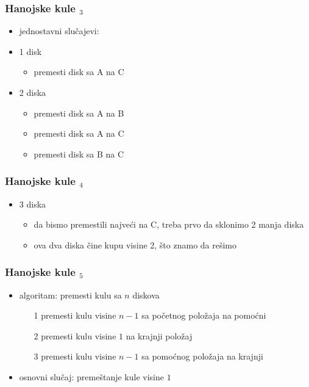 \documentclass[utf8,compress]{beamer}
\begin{document}
\begin{frame}[fragile]
  \frametitle{Hanojske kule $_3$}
  \begin{itemize}
    \item jednostavni slučajevi:
    \item 1 disk
  \begin{itemize}
    \item premesti disk sa A na C
  \end{itemize}
    \item 2 diska
  \begin{itemize}
    \item premesti disk sa A na B
    \item premesti disk sa A na C
    \item premesti disk sa B na C
  \end{itemize}
  \end{itemize}
\end{frame}

\begin{frame}[fragile]
  \frametitle{Hanojske kule $_4$}
  \begin{itemize}
    \item 3 diska
  \begin{itemize}
    \item da bismo premestili najveći na C, treba prvo da sklonimo 2 manja diska
    \item ova dva diska čine kupu visine 2, što znamo da rešimo
  \end{itemize}
  \end{itemize}
\end{frame}

\begin{frame}[fragile]
  \frametitle{Hanojske kule $_5$}
  \begin{itemize}
    \item algoritam: premesti kulu sa $n$ diskova
  \begin{itemize}
    \item[1] premesti kulu visine $n-1$ sa početnog položaja na pomoćni
    \item[2] premesti kulu visine $1$ na krajnji položaj
    \item[3] premesti kulu visine $n-1$ sa pomoćnog položaja na krajnji
  \end{itemize}
    \item osnovni slučaj: premeštanje kule visine $1$
  \end{itemize}
\end{frame}
\end{document}
